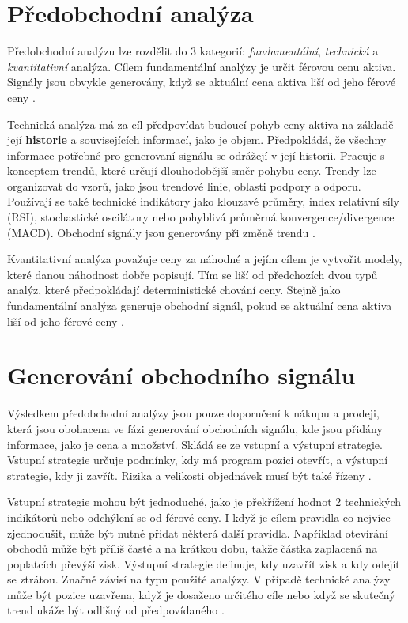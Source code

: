 \section{Předobchodní analýza}
Předobchodní analýzu lze rozdělit do 3 kategorií: \textit{fundamentální}, \textit{technická} a \textit{kvantitativní} analýza.
Cílem fundamentální analýzy je určit férovou cenu aktiva.
Signály jsou obvykle generovány, když se aktuální cena aktiva liší od jeho férové ceny \cite{nuti}.

Technická analýza má za cíl předpovídat budoucí pohyb ceny aktiva na základě její \textbf{historie} a souvisejících informací, jako je objem.
Předpokládá, že všechny informace potřebné pro generovaní signálu se odrážejí v její historii.
Pracuje s konceptem trendů, které určují dlouhodobější směr pohybu ceny.
Trendy lze organizovat do vzorů, jako jsou trendové linie, oblasti podpory a odporu.
Používají se také technické indikátory jako klouzavé průměry, index relativní síly (RSI), stochastické oscilátory nebo pohyblivá průměrná konvergence/divergence (MACD).
Obchodní signály jsou generovány při změně trendu \cite{nuti}.

Kvantitativní analýza považuje ceny za náhodné a jejím cílem je vytvořit modely, které danou náhodnost dobře popisují.
Tím se liší od předchozích dvou typů analýz, které předpokládají deterministické chování ceny.
Stejně jako fundamentální analýza generuje obchodní signál, pokud se aktuální cena aktiva liší od jeho férové ceny \cite{nuti}.

\section{Generování obchodního signálu}
Výsledkem předobchodní analýzy jsou pouze doporučení k nákupu a prodeji, která jsou obohacena ve fázi generování obchodních signálu, kde jsou přidány informace, jako je cena a množství.
Skládá se ze vstupní a výstupní strategie.
Vstupní strategie určuje podmínky, kdy má program pozici otevřít, a výstupní strategie, kdy ji zavřít.
Rizika a velikosti objednávek musí být také řízeny \cite{nuti}.

Vstupní strategie mohou být jednoduché, jako je překřížení hodnot 2 technických indikátorů nebo odchýlení se od férové ceny.
I když je cílem pravidla co nejvíce zjednodušit, může být nutné přidat některá další pravidla.
Například otevírání obchodů může být příliš časté a na krátkou dobu, takže částka zaplacená na poplatcích převýší zisk.
Výstupní strategie definuje, kdy uzavřít zisk a kdy odejít se ztrátou.
Značně závisí na typu použité analýzy.
V případě technické analýzy může být pozice uzavřena, když je dosaženo určitého cíle nebo když se skutečný trend ukáže být odlišný od předpovídaného \cite{nuti}.

